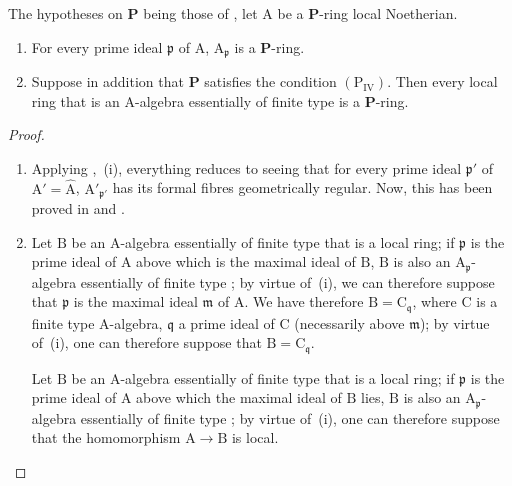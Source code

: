 \begin{theorem}[7.4.4]
\label{IV.7.4.4}
The hypotheses on $\boldsymbol{P}$ being those of , let $\mathrm{A}$ be a $\boldsymbol{P}$-ring local Noetherian.
\begin{enumerate}[label=\emph{\roman*)}]
  \item For every prime ideal $\mathfrak{p}$ of $\mathrm{A}$, $\mathrm{A}_\mathfrak{p}$ is a $\boldsymbol{P}$-ring.
  \item Suppose in addition that $\boldsymbol{P}$ satisfies the condition $(\mathrm{P_{IV}})$.
  Then every local ring that is an A-algebra essentially of finite type is a $\boldsymbol{P}$-ring.
\end{enumerate}
\end{theorem}

\begin{proof}
\begin{enumerate}[label=(\roman*)]
  \item Applying ,~(i), everything reduces to seeing that for every prime ideal $\mathfrak{p}'$ of $\mathrm{A}'=\widehat{\mathrm{A}}$, $\mathrm{A}'_{\mathfrak{p}'}$ has its formal fibres geometrically regular.
  Now, this has been proved in  and .

  \item Let $\mathrm{B}$ be an A-algebra essentially of finite type that is a local ring; if $\mathfrak{p}$ is the prime ideal of $\mathrm{A}$ above which is the maximal ideal of $\mathrm{B}$, $\mathrm{B}$ is also an $\mathrm{A}_\mathfrak{p}$-algebra essentially of finite type ; by virtue of~(i), we can therefore suppose that $\mathfrak{p}$ is the maximal ideal $\mathfrak{m}$ of $\mathrm{A}$.
  We have therefore $\mathrm{B}=\mathrm{C}_\mathfrak{q}$, where $\mathrm{C}$ is a finite type A-algebra, $\mathfrak{q}$ a prime ideal of $\mathrm{C}$ (necessarily above $\mathfrak{m}$); by virtue of~(i), one can therefore suppose that $\mathrm{B}=\mathrm{C}_\mathfrak{q}$.

  Let $\mathrm{B}$ be an A-algebra essentially of finite type that is a local ring; if $\mathfrak{p}$ is the prime ideal of $\mathrm{A}$ above which the maximal ideal of $\mathrm{B}$ lies, $\mathrm{B}$ is also an $\mathrm{A}_\mathfrak{p}$-algebra essentially of finite type ; by virtue of~(i), one can therefore suppose that the homomorphism $\mathrm{A}\to\mathrm{B}$ is local.


\end{enumerate}
\end{proof}
